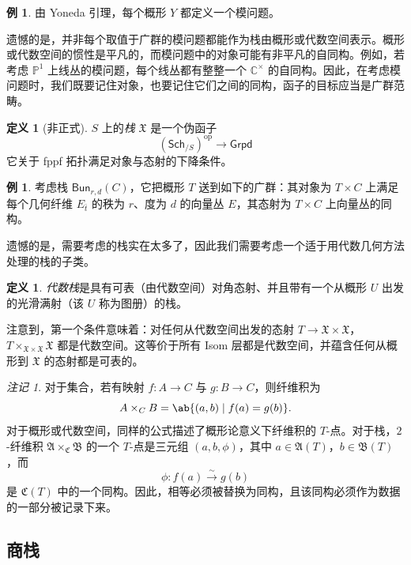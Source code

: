 \documentclass{amsart}
\theoremstyle{definition}
\newtheorem{defn}[thm]{定义}
\newtheorem{exm}[thm]{例}
\theoremstyle{remark}
\newtheorem{rmk}[thm]{注记}
\theoremstyle{plain}
\theoremstyle{definition}
\theoremstyle{remark}
\newcommand{\C}{\mathbb{C}}
\renewcommand{\P}{\mathbb{P}}
\newcommand{\mf}[1]{\mathfrak{#1}}
\newcommand{\mr}[1]{\mathrm{#1}}
\newcommand{\ms}[1]{\mathsf{#1}}
\newcommand{\1}{\mathbf{1}}
\newcommand{\2}{\mathbf{2}}
\newcommand{\3}{\mathbf{3}}
\begin{document}
\begin{exm}
    由 Yoneda 引理，每个概形 \(Y\) 都定义一个模问题。
\end{exm}

遗憾的是，并非每个取值于广群的模问题都能作为栈由概形或代数空间表示。概形或代数空间的惯性是平凡的，而模问题中的对象可能有非平凡的自同构。例如，若考虑 \(\P^1\) 上线丛的模问题，每个线丛都有整整一个 \(\C^{\times}\) 的自同构。因此，在考虑模问题时，我们既要记住对象，也要记住它们之间的同构，函子的目标应当是广群范畴。

\begin{defn}[非正式]
    \(S\) 上的\textit{栈} \(\mf{X}\) 是一个伪函子
    \[ (\ms{Sch}_{/S})^{\mr{op}} \to \ms{Grpd} \]
    它关于 fppf 拓扑满足对象与态射的下降条件。
\end{defn}

\begin{exm}
    考虑栈 \(\ms{Bun}_{r,d}(C)\)，它把概形 \(T\) 送到如下的广群：其对象为 \(T\times C\) 上满足每个几何纤维 \(E_{\bar t}\) 的秩为 \(r\)、度为 \(d\) 的向量丛 \(E\)，其态射为 \(T\times C\) 上向量丛的同构。
\end{exm}

遗憾的是，需要考虑的栈实在太多了，因此我们需要考虑一个适于用代数几何方法处理的栈的子类。

\begin{defn}
    \textit{代数栈}是具有可表（由代数空间）对角态射、并且带有一个从概形 \(U\) 出发的光滑满射（该 \(U\) 称为图册）的栈。 
\end{defn}

注意到，第一个条件意味着：对任何从代数空间出发的态射 \(T \to \mf{X} \times \mf{X}\)，\(T \times_{\mf{X} \times \mf{X}} \mf{X}\) 都是代数空间。这等价于所有 Isom 层都是代数空间，并蕴含任何从概形到 \(\mf{X}\) 的态射都是可表的。

\begin{rmk}
    对于集合，若有映射 \(f\colon A\to C\) 与 \(g\colon B\to C\)，则纤维积为
    \[ 
        A\times_C B=\ab\{(a,b)\mid f(a)=g(b)\}. 
    \] 
    对于概形或代数空间，同样的公式描述了概形论意义下纤维积的 \(T\)-点。对于栈，\(2\)-纤维积 \(\mf{A}\times_{\mf{C}}\mf{B}\) 的一个 \(T\)-点是三元组 \((a,b,\phi)\)，其中 \(a\in\mf{A}(T)\)，\(b\in\mf{B}(T)\)，而
    \[ 
        \phi\colon f(a)\xrightarrow{\sim}g(b) 
    \]
    是 \(\mf{C}(T)\) 中的一个同构。因此，相等必须被替换为同构，且该同构必须作为数据的一部分被记录下来。
\end{rmk}


\subsection{商栈}%
\label{sub:Quotient stacks}
\end{document}
